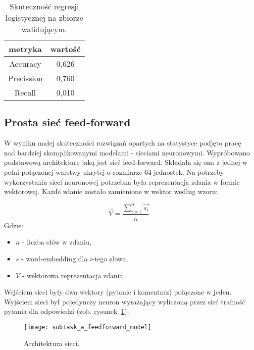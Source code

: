 \begin{table}[H]
\caption{Skuteczność regresji logistycznej na zbiorze walidującym. \label{tab:train_set_statistics_score_table}}
    \begin{center}
        \begin{tabular}{ |c|c| } 
            \hline
            metryka & wartość\\
            \hline
            Accuracy & 0,626 \\
            \hline
            Precission & 0,760 \\
            \hline
            Recall & 0,010 \\ 
            \hline
        \end{tabular}
    \end{center}
\end{table}



\subsection{Prosta sieć feed-forward}

W wyniku małej skuteczności rozwiązań opartych na statystyce podjęto pracę nad bardziej skomplikowanymi modelami - sieciami neuronowymi. Wypróbowano podstawową architekturę jaką jest sieć feed-forward. Składała się ona z jednej w pełni połączonej warstwy ukrytej o rozmiarze 64 jednostek. Na potrzeby wykorzystania sieci neuronowej potrzebna była reprezentacja zdania w formie wektorowej. Każde zdanie zostało zamienione w wektor według wzoru:

\begin{equation}
\overrightarrow{V} = \frac{\sum_{i=1}^{n}\overrightarrow{s_i}}{n}
\end{equation}
Gdzie:
\begin{itemize}
\item $n$ - liczba słów w zdaniu,
\item $s$ - word-embedding dla $i$-tego słowa,
\item $V$ - wektorowa reprezentacja zdania.
\end{itemize}

Wejściem sieci były dwa wektory (pytanie i komentarz) połączone w jeden. Wyjściem sieci był pojedynczy neuron wyrażający wyliczoną przez sieć trafność pytania dla odpowiedzi (zob. rysunek~\ref{fig:ffa}).


\begin{figure}[H]
\caption{Architektura sieci. \label{fig:ffa}}
\texttt{[image: subtask\_a\_feedforward\_model]}
\centering
\end{figure}

